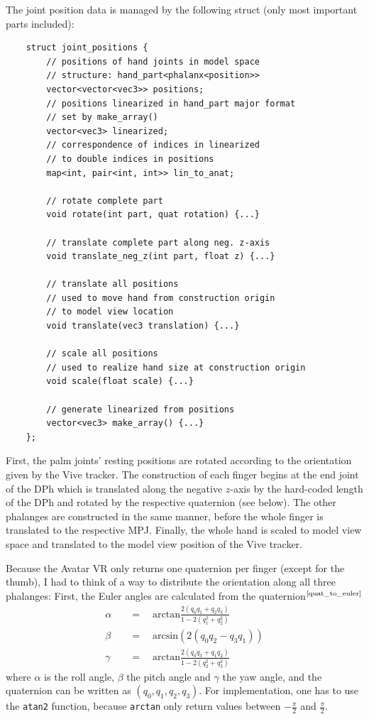 \documentclass[hyperref, bachelorofscience]{cgvpub}
\newcommand{\newcite}[1]{$ ^{\text{\cite{#1}}} $}
\begin{document}
The joint position data is managed by the following struct (only most important parts included):
\begin{lstlisting}
	struct joint_positions {
		// positions of hand joints in model space
		// structure: hand_part<phalanx<position>>
		vector<vector<vec3>> positions;
		// positions linearized in hand_part major format
		// set by make_array() 
		vector<vec3> linearized;
		// correspondence of indices in linearized
		// to double indices in positions
		map<int, pair<int, int>> lin_to_anat;
				
		// rotate complete part
		void rotate(int part, quat rotation) {...}
		
		// translate complete part along neg. z-axis
		void translate_neg_z(int part, float z) {...}
		
		// translate all positions
		// used to move hand from construction origin
		// to model view location
		void translate(vec3 translation) {...}
		
		// scale all positions
		// used to realize hand size at construction origin
		void scale(float scale) {...}
		
		// generate linearized from positions
		vector<vec3> make_array() {...}
	};
\end{lstlisting}

First, the palm joints' resting positions are rotated according to the orientation given by the Vive tracker. The construction of each finger begins at the end joint of the \gls{DPh} which is translated along the negative $ z $-axis by the hard-coded length of the \gls{DPh} and rotated by the respective quaternion (see below). The other phalanges are constructed in the same manner, before the whole finger is translated to the respective \gls{MPJ}. Finally, the whole hand is scaled to model view space and translated to the model view position of the Vive tracker.

Because the Avatar VR only returns one quaternion per finger (except for the thumb), I had to think of a way to distribute the orientation along all three phalanges: First, the Euler angles are calculated from the quaternion\newcite{quat_to_euler}
\begin{align*}
	\alpha \quad&=\quad \mbox{arctan} \frac {2(q_0 q_1 + q_2 q_3)} {1 - 2(q_1^2 + q_2^2)} \\
	\beta \quad&=\quad \mbox{arcsin} (2(q_0 q_2 - q_3 q_1)) \\
	\gamma \quad&=\quad \mbox{arctan} \frac {2(q_0 q_3 + q_1 q_2)} {1 - 2(q_2^2 + q_3^2)}
\end{align*}
where $ \alpha $ is the roll angle, $ \beta $ the pitch angle and $ \gamma $ the yaw angle, and the quaternion can be written as $ (q_{0}, q_{1}, q_{2}, q_{3}) $. For implementation, one has to use the \lstinline|atan2| function, because \lstinline|arctan| only return values between $ -\frac{\pi}{2} $ and $ \frac{\pi}{2} $.
\end{document}
